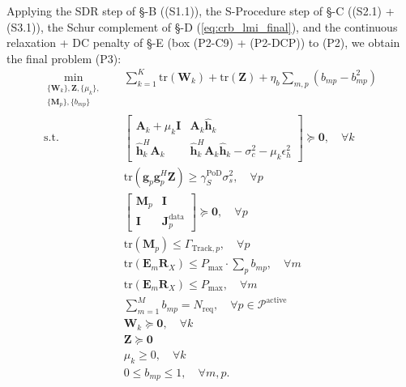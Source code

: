 \documentclass[12pt,a4paper]{article}
\newcommand{\vect}[1]{\mathbf{#1}}
\newcommand{\mat}[1]{\mathbf{#1}}
\newcommand{\tr}{\text{tr}}
\begin{document}
Applying the SDR step of \S-B ((S1.1)), the S-Procedure step of \S-C ((S2.1) + (S3.1)), the Schur complement of \S-D (\eqref{eq:crb_lmi_final}), and the continuous relaxation + DC penalty of \S-E (box (P2-C9) + (P2-DCP)) to (P2), we obtain the final problem (P3):
\begin{align}
\min_{\substack{\{\mat{W}_k\}, \mat{Z}, \{\mu_k\}, \\ \{\mat{M}_p\}, \{b_{mp}\}}} \quad
& \sum_{k=1}^K \tr(\mat{W}_k) + \tr(\mat{Z}) + \eta_b \sum_{m, p} (b_{mp} - b_{mp}^2) \tag{P3} \\
\text{s.t.} \quad
& \begin{bmatrix} \mat{A}_k + \mu_k \mat{I} & \mat{A}_k \hat{\vect{h}}_k \\[1.5ex] \hat{\vect{h}}_k^H \mat{A}_k & \hat{\vect{h}}_k^H \mat{A}_k \hat{\vect{h}}_k - \sigma_c^2 - \mu_k \epsilon_h^2 \end{bmatrix} \succeq \mat{0}, \quad \forall k \tag{P3-C1} \label{eq:p3c1} \\
& \tr(\vect{g}_p \vect{g}_p^H \mat{Z}) \geq \gamma_S^{\text{PoD}} \sigma_s^2, \quad \forall p \tag{P3-C2} \label{eq:p3c2} \\
& \begin{bmatrix} \mat{M}_p & \mat{I} \\ \mat{I} & \mat{J}_p^{\text{data}} \end{bmatrix} \succeq \mat{0}, \quad \forall p \tag{P3-C3} \label{eq:p3c3} \\
& \tr(\mat{M}_p) \leq \Gamma_{\text{Track},p}, \quad \forall p \tag{P3-C3b} \label{eq:p3c3b} \\
& \tr(\mat{E}_m \mat{R}_X) \leq P_{\max} \cdot \sum_p b_{mp}, \quad \forall m \tag{P3-C4'a} \label{eq:p3c4a} \\
& \tr(\mat{E}_m \mat{R}_X) \leq P_{\max}, \quad \forall m \tag{P3-C4'b} \label{eq:p3c4b} \\
& \sum_{m=1}^{M} b_{mp} = N_{\text{req}}, \quad \forall p \in \mathcal{P}^{\text{active}} \tag{P3-C5'} \label{eq:p3c5} \\
& \mat{W}_k \succeq \mat{0}, \quad \forall k \tag{P3-C6} \label{eq:p3c6} \\
& \mat{Z} \succeq \mat{0} \tag{P3-C7} \label{eq:p3c7} \\
& \mu_k \geq 0, \quad \forall k \tag{P3-C8} \label{eq:p3c8} \\
& 0 \leq b_{mp} \leq 1, \quad \forall m, p. \tag{P3-C9} \label{eq:p3c9}
\end{align}
\end{document}
